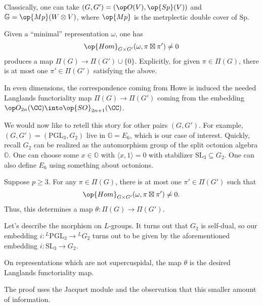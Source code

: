\documentclass{article}
\begin{document}
Classically, one can take $(G,G')=(\op O(V),\op{Sp}(V))$ and $\mathbb G=\op{Mp}(W\otimes V)$, where $\op{Mp}$ is the metrplectic double cover of $\mathrm{Sp}$.
\begin{theorem}[Howe]
	Given a ``minimal'' representation $\omega$, one has
	\[\op{Hom}_{G\times G'}(\omega,\pi\boxtimes\pi')\ne0\]
	produces a map $\Pi(G)\to\Pi(G')\cup\{0\}$. Explicitly, for given $\pi\in\Pi(G)$, there is at most one $\pi'\in\Pi(G')$ satisfying the above.
\end{theorem}
\begin{theorem}[Atobe]
	In even dimensions, the correspondence coming from Howe is induced the needed Langlands functoriality map $\Pi(G)\to\Pi(G')$ coming from the embedding $\op O_{2n}(\CC)\into\op{SO}_{2n+1}(\CC)$.
\end{theorem}
We would now like to retell this story for other pairs $(G,G')$. For example, $(G,G')=(\mathrm{PGL}_3,G_2)$ live in $\mathbb G=E_6$, which is our case of interest. Quickly, recall $G_2$ can be realized as the automorphism group of the split octonion algebra $\mathbb O$. One can choose some $x\in\mathbb O$ with $\langle x,1\rangle=0$ with stabilizer $\mathrm{SL}_3\subseteq G_2$. One can also define $E_6$ using something about octonions.
\begin{theorem}
	Suppose $p\ge3$. For any $\pi\in\Pi(G)$, there is at most one $\pi'\in\Pi(G')$ such that
	\[\op{Hom}_{G\times G'}(\omega,\pi\boxtimes\pi')\ne0.\]
	Thus, this determines a map $\theta\colon\Pi(G)\to\Pi(G')$.
\end{theorem}
Let's describe the morphism on $L$-groups. It turns out that $G_2$ is self-dual, so our embedding $i\colon {^L\mathrm{PGL}_3}\to{^LG_2}$ turns out to be given by the aforementioned embedding $i\colon\mathrm{SL}_3\to G_2$.
\begin{theorem}[Gan]
	On representations which are not supercuspidal, the map $\theta$ is the desired Langlands functoriality map.
\end{theorem}
The proof uses the Jacquet module and the observation that this smaller amount of information.
\end{document}
